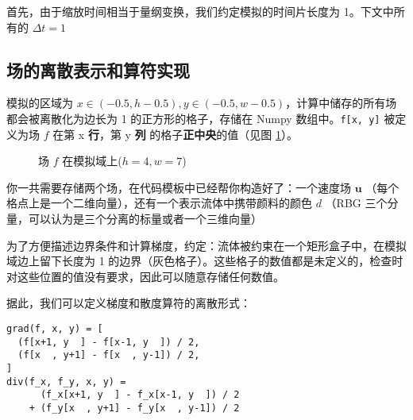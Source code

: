 \documentclass{ctexart}
\begin{document}
首先，由于缩放时间相当于量纲变换，我们约定模拟的时间片长度为 1。下文中所有的 $\Delta t = 1$

\subsection{场的离散表示和算符实现}

模拟的区域为 $x \in (-0.5, h-0.5), y \in (-0.5, w-0.5)$，计算中储存的所有场都会被离散化为边长为 1 的正方形的格子，存储在 Numpy 数组中。\texttt{f[x, y]} 被定义为场 $f$ 在第 x \textbf{行}，第 y \textbf{列} 的格子\textbf{正中央}的值（见图 \ref{fig:grid}）。

\begin{figure}[h!]
  \label{fig:grid}
  \centering

  \caption{场 $f$ 在模拟域上($h = 4, w = 7$)}
\end{figure}

你一共需要存储两个场，在代码模板中已经帮你构造好了：一个速度场 $\mathbf{u}$ （每个格点上是一个二维向量），还有一个表示流体中携带颜料的颜色 $d$ （RBG 三个分量，可以认为是三个分离的标量或者一个三维向量）

为了方便描述边界条件和计算梯度，约定：流体被约束在一个矩形盒子中，在模拟域边上留下长度为 1 的边界（灰色格子）。这些格子的数值都是未定义的，检查时对这些位置的值没有要求，因此可以随意存储任何数值。

据此，我们可以定义梯度和散度算符的离散形式：

\begin{verbatim}
grad(f, x, y) = [
  (f[x+1, y  ] - f[x-1, y  ]) / 2,
  (f[x  , y+1] - f[x  , y-1]) / 2,
]
div(f_x, f_y, x, y) =
      (f_x[x+1, y  ] - f_x[x-1, y  ]) / 2
    + (f_y[x  , y+1] - f_y[x  , y-1]) / 2
\end{verbatim}
\end{document}
